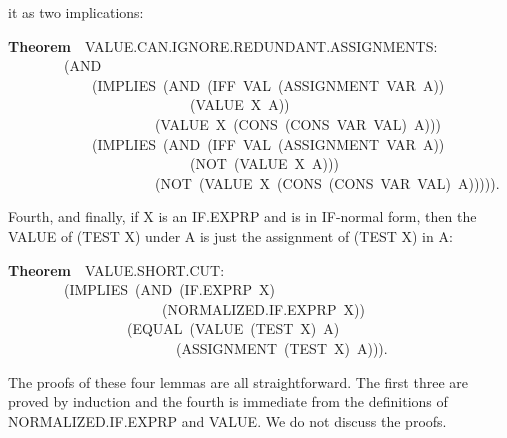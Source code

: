 \documentclass[10pt]{book}
\newenvironment{pubasis}{\begin{flushleft}}{\end{flushleft}}
\newcommand{\axiomordefinition}[1]{\vspace{6pt}\Large\textsf{\textbf{#1}}\normalsize}
\begin{document}
it as two implications:
\begin{pubasis}
\axiomordefinition{Theorem}~~VALUE.CAN.IGNORE.REDUNDANT.ASSIGNMENTS:\\
~~~~~~~~(AND\\
~~~~~~~~~~~~(IMPLIES~(AND~(IFF~VAL~(ASSIGNMENT~VAR~A))\\
~~~~~~~~~~~~~~~~~~~~~~~~~~(VALUE~X~A))\\
~~~~~~~~~~~~~~~~~~~~~(VALUE~X~(CONS~(CONS~VAR~VAL)~A)))\\
~~~~~~~~~~~~(IMPLIES~(AND~(IFF~VAL~(ASSIGNMENT~VAR~A))\\
~~~~~~~~~~~~~~~~~~~~~~~~~~(NOT~(VALUE~X~A)))\\
~~~~~~~~~~~~~~~~~~~~~(NOT~(VALUE~X~(CONS~(CONS~VAR~VAL)~A))))).\\
\end{pubasis}
Fourth, and finally, if X is an IF.EXPRP and is in IF-normal form,
then the VALUE of (TEST X) under A is just the assignment of (TEST X) in
A:
\begin{pubasis}
\axiomordefinition{Theorem}~~VALUE.SHORT.CUT:\\
~~~~~~~~(IMPLIES~(AND~(IF.EXPRP~X)\\
~~~~~~~~~~~~~~~~~~~~~~(NORMALIZED.IF.EXPRP~X))\\
~~~~~~~~~~~~~~~~~(EQUAL~(VALUE~(TEST~X)~A)\\
~~~~~~~~~~~~~~~~~~~~~~~~(ASSIGNMENT~(TEST~X)~A))).\\
\end{pubasis}
The proofs of these four lemmas are all straightforward.  The first three
are proved by induction and the fourth is immediate from the definitions
of NORMALIZED.IF.EXPRP and VALUE.  We do not discuss the proofs.
\end{document}
